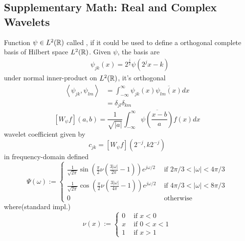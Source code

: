 \documentclass{article}
\begin{document}
\subsection{Supplementary Math: Real and Complex Wavelets}
    Function $\psi \in L^2(\mathbb{R})$ called , if it could be used to define a orthogonal complete basis of Hilbert space $L^2(\mathbb{R})$. Given $\psi$, the basis are
    \begin{align}
        & \psi_{j k}(x)=2^{\frac{j}{2}} \psi\left(2^{j} x-k\right)
    \end{align}
    under normal inner-product on $L^2(\mathbb{R})$, it's orthogonal
    \begin{equation}
        \begin{aligned}
        \left\langle\psi_{j k}, \psi_{l m}\right\rangle &=\int_{-\infty}^{\infty} \psi_{j k}(x) \overline{\psi_{l m}(x)} d x \\
        &=\delta_{j l} \delta_{k m}
        \end{aligned}
    \end{equation}
    \begin{equation}
        \left[W_{\psi} f\right](a, b)=\frac{1}{\sqrt{|a|}} \int_{-\infty}^{\infty} \overline{\psi\left(\frac{x-b}{a}\right)} f(x) d x
    \end{equation}
    wavelet coefficient given by
    \begin{equation}
        c_{j k}=\left[W_{\psi} f\right]\left(2^{-j}, k 2^{-j}\right)
    \end{equation}
     in frequency-domain defined
    \begin{equation}
        \Psi(\omega):=\left\{\begin{array}{ll}
        \frac{1}{\sqrt{2 \pi}} \sin \left(\frac{\pi}{2} \nu\left(\frac{3|\omega|}{2 \pi}-1\right)\right) e^{j \omega / 2} & \text { if } 2 \pi / 3<|\omega|<4 \pi / 3 \\
        \frac{1}{\sqrt{2 \pi}} \cos \left(\frac{\pi}{2} \nu\left(\frac{3|\omega|}{4 \pi}-1\right)\right) e^{j \omega / 2} & \text { if } 4 \pi / 3<|\omega|<8 \pi / 3 \\
        0 & \text { otherwise }
        \end{array}\right.
    \end{equation}
    where(standard impl.)
    \begin{equation}
        \nu(x):=\left\{\begin{array}{ll}
        0 & \text { if } x<0 \\
        x & \text { if } 0<x<1 \\
        1 & \text { if } x>1
        \end{array}\right.
    \end{equation}
\end{document}
